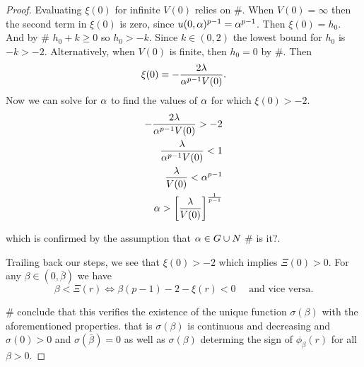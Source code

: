 \begin{proof}
Evaluating $\xi(0)$ for infinite $V(0)$ relies on \#. When $V(0)=\infty$ then
the second term in $\xi(0)$ is zero, since $u(0,\alpha)^{p-1}=\alpha^{p-1}$. Then
$\xi(0)=h_0$. And by \# $h_0+k\geq0$ so $h_0>-k$. Since $k\in(0,2)$ the lowest
bound for $h_0$ is $-k>-2$. Alternatively, when $V(0)$ is finite, then $h_0=0$
by \#. Then $$\xi(0)=-\frac{2\lambda}{\alpha^{p-1}V(0)}.$$ Now we can solve for $\alpha$
to find the values of $\alpha$ for which $\xi(0)>-2$.  
\begin{align*}
-\frac{2\lambda}{\alpha^{p-1}V(0)}>-2\\ \frac{\lambda}{\alpha^{p-1}V(0)}<1\\
\frac{\lambda}{V(0)}<\alpha^{p-1}\\ 
\alpha > \left[\frac{\lambda}{V(0)}\right]^{\frac{1}{p-1}} 
\end{align*} 

which is confirmed by the assumption that $\alpha\in G\cup N$ \# is it?.

Trailing back our steps, we see that $\xi(0)>-2$ which implies $\Xi(0)>0$. For
any $\beta\in(0,\bar{\beta})$ we have
$$\beta<\Xi(r)\iff\beta(p-1)-2-\xi(r)<0\quad\text{ and vice versa.}$$ 

\# conclude that this verifies the existence of the unique function
$\sigma(\beta)$ with the aforementioned properties. that is $\sigma(\beta)$ is
continuous and decreasing and $\sigma(0)>0$ and $\sigma(\bar{\beta})=0$ as well
as $\sigma(\beta)$ determing the sign of $\phi_\beta(r)$ for all $\beta>0$.
\end{proof}
\endgroup

